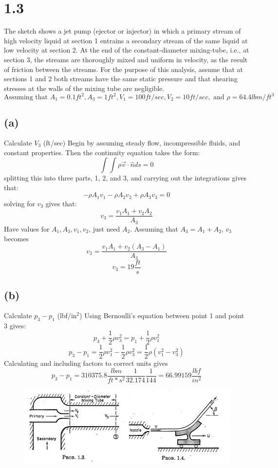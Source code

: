 \documentclass[preview,12pt]{article}
\begin{document}
\section*{1.3} 
    The sketch shows a jet pump (ejector or injector) in which a primary stream of high velocity liquid at section 1 entrains a secondary stream of the same liquid at low velocity at section 2.  At the end of the constant-diameter mixing-tube, i.e., at section 3, the streams are thoroughly mixed and uniform in velocity, as the result of friction between the streams. \newline For the purpose of this analysis, assume that at sections 1 and 2 both streams have the same static pressure and that shearing stresses at the walls of the mixing tube are negligible.
    $$\textrm{Assuming that } A_1=0.1ft^2, A_3=1ft^2, V_1=100ft/sec, V_2=10 ft/sec, \textrm{ and } \rho=64.4 lbm/ft^3$$
    \subsection*{(a)} 
        Calculate $V_3$ (ft/sec) \newline
        Begin by assuming steady flow, incompressible fluids, and constant properties.  Then the continuity equation takes the form:
        $$\int\int\rho \vec{v}\cdot\hat{n}ds=0$$
        splitting this into three parts, 1, 2, and 3, and carrying out the integrations gives that:
        $$-\rho A_1v_1-\rho A_2v_2+\rho A_3v_3=0$$
        solving for $v_3$ gives that:
        $$v_3=\frac{v_1A_1+v_2A_2}{A_3}$$
        Have values for $A_1,A_3,v_1,v_2$, just need $A_2$.  Assuming that $A_3=A_1+A_2$, $v_3$ becomes
        $$v_3=\frac{v_1A_1+v_2(A_3-A_1)}{A_3}$$
        $$v_3=19\frac{ft}{s}$$
    \subsection*{(b)} 
        Calculate $p_3-p_1$ (lbf/in$^2$) \newline
        Using Bernoulli's equation between point 1 and point 3 gives:
        $$p_3+\frac{1}{2}\rho v_3^2=p_1+\frac{1}{2}\rho v_1^2$$
        $$p_3-p_1=\frac{1}{2}\rho v_1^2-\frac{1}{2}\rho v_3^2=\frac{1}{2}\rho(v_1^2-v_3^2)$$
        Calculating and including factors to correct units gives
        $$p_3-p_1=310375.8\frac{lbm}{ft*s^2}\frac{1}{32.174}\frac{1}{144}=66.99159\frac{lbf}{in^2}$$ 
    \begin{figure}
        \centering
        \includegraphics[width=\textwidth]{HW1_3and4.PNG}
    \end{figure}
    
\end{document}
